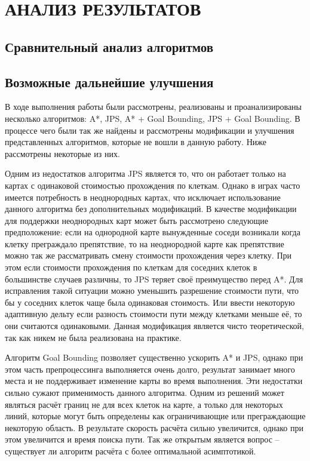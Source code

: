 \section[Анализ результатов]{\MakeTextUppercase{АНАЛИЗ РЕЗУЛЬТАТОВ}}

\subsection{Сравнительный анализ алгоритмов}

\subsection{Возможные дальнейшие улучшения}

В ходе выполнения работы были рассмотрены, реализованы и проанализированы несколько алгоритмов: A*, JPS, A* + Goal Bounding, JPS + Goal Bounding. В процессе чего были так же найдены и рассмотрены модификации и улучшения представленных алгоритмов, которые не вошли в данную работу. Ниже рассмотрены некоторые из них.

Одним из недостатков алгоритма JPS является то, что он работает только на картах с одинаковой стоимостью прохождения по клеткам. Однако в играх часто имеется потребность в неоднородных картах, что исключает использование данного алгоритма без дополнительных модификаций. В качестве модификации для поддержки неоднородных карт может быть рассмотрено следующие предположение: если на однородной карте вынужденные соседи возникали когда клетку преграждало препятствие, то на неоднородной карте как препятствие можно так же рассматривать смену стоимости прохождения через клетку. При этом если стоимости прохождения по клеткам для соседних клеток в большинстве случаев различны, то JPS теряет своё преимущество перед A*. Для исправления такой ситуации можно уменьшить разрешение стоимости пути, что бы у соседних клеток чаще была одинаковая стоимость. Или ввести некоторую адаптивную дельту если разность стоимости пути между клетками меньше её, то они считаются одинаковыми. Данная модификация является чисто теоретической, так как никем не была реализована на практике.

Алгоритм Goal Bounding позволяет существенно ускорить A* и JPS, однако при этом часть препроцессинга выполняется очень долго, результат занимает много места и не поддерживает изменение карты во время выполнения. Эти недостатки сильно сужают применимость данного алгоритма. Одним из решений может являться расчёт границ не для всех клеток на карте, а только для некоторых линий, которые могут быть определены как ограничивающие или преграждающие некоторую область. В результате скорость расчёта сильно увеличится, однако при этом увеличится и время поиска пути. Так же открытым является вопрос -- существует ли алгоритм расчёта с более оптимальной асимптотикой.

